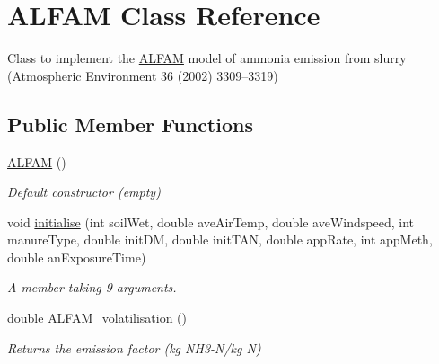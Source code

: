 \hypertarget{class_a_l_f_a_m}{}\section{A\+L\+F\+AM Class Reference}
\label{class_a_l_f_a_m}


Class to implement the \mbox{\hyperlink{class_a_l_f_a_m}{A\+L\+F\+AM}} model of ammonia emission from slurry (Atmospheric Environment 36 (2002) 3309–3319)  


\subsection*{Public Member Functions}
\begin{DoxyCompactItemize}
\item 
\mbox{\hyperlink{class_a_l_f_a_m_a906de2a7e6a63d037313aecb092e08fa}{A\+L\+F\+AM}} ()
\begin{DoxyCompactList}\small\item\em Default constructor (empty) \end{DoxyCompactList}\item 
void \mbox{\hyperlink{class_a_l_f_a_m_a99b2b359704634465506484436dbd8f2}{initialise}} (int soil\+Wet, double ave\+Air\+Temp, double ave\+Windspeed, int manure\+Type, double init\+DM, double init\+T\+AN, double app\+Rate, int app\+Meth, double an\+Exposure\+Time)
\begin{DoxyCompactList}\small\item\em A member taking 9 arguments. \end{DoxyCompactList}\item 
double \mbox{\hyperlink{class_a_l_f_a_m_a74f67c0b90bec2b1423add60999fb332}{A\+L\+F\+A\+M\+\_\+volatilisation}} ()
\begin{DoxyCompactList}\small\item\em Returns the emission factor (kg N\+H3-\/\+N/kg N) \end{DoxyCompactList}\end{DoxyCompactItemize}
